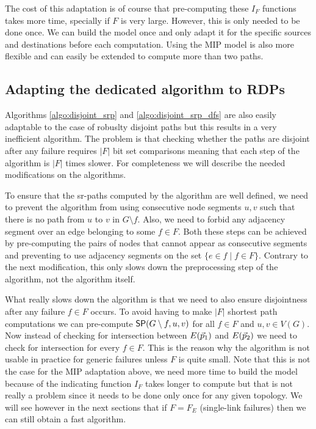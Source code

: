 The cost of this adaptation is of course that pre-computing these $I_F$ functions takes more time,
specially if $F$ is very large. However, this is only needed to be done once. We can build the model
once and only adapt it for the specific sources and destinations before each computation. Using the MIP model
is also more flexible and can easily be extended to compute more than two paths. 

\subsection{Adapting the dedicated algorithm to RDPs}

Algorithms \ref{algo:disjoint_srp} and \ref{algo:disjoint_srp_dfs} are also easily adaptable
to the case of robuslty disjoint paths but this results in a very inefficient algorithm.
The problem is that checking whether the paths are disjoint after any failure requires 
$|F|$ bit set comparisons meaning that each step of the algorithm is $|F|$ times slower.
For completeness we will describe the needed modifications on the algorithms.

To ensure that the sr-paths computed by the algorithm are well defined, 
we need to prevent the algorithm from using consecutive node segments $u, v$ such that 
there is no path from $u$ to $v$ in $G \setminus f$. Also, we need to forbid any adjacency 
segment over an edge belonging to some $f \in F$. Both these steps can be achieved by
pre-computing the pairs of nodes that cannot appear as consecutive segments and 
preventing to use adjacency segments on the set $\{ e \in f \mid f \in F\}$. Contrary to the
next modification, this only slows down the preprocessing step of the algorithm, not the
algorithm itself.

What really slows down the algorithm is that we need to also ensure disjointness after any failure $f \in F$ occurs.
To avoid having to make $|F|$ shortest path computations we can pre-compute
$\sp(G \setminus f, u, v)$ for all $f \in F$ and $u, v \in V(G)$. Now instead of checking
for intersection between $E(\sr{p}_1)$ and $E(\sr{p}_2)$ we need to check 
for intersection for every $f \in F$. This is the reason why the algorithm is 
not usable in practice for generic failures unless $F$ is quite small. Note that this is not the case for the
MIP adaptation above, we need more time to build the model because of the
indicating function $I_F$ takes longer to compute but that is not really a problem
since it needs to be done only once for any given topology. We will see however
in the next sections that if $F = F_E$ (single-link failures) then we can
still obtain a fast algorithm.

